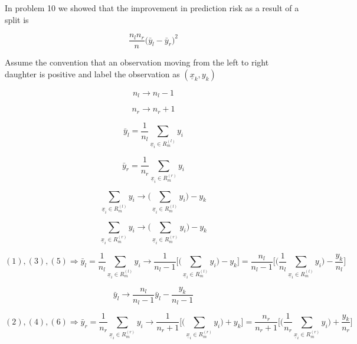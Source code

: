 \documentclass[11pt]{article}
\begin{document}
In problem 10 we showed that the improvement in prediction risk as a result of 
a split is 

$$ \frac{n_ln_r}{n}\big(\bar{y}_l - \bar{y}_r\big)^2$$

Assume the convention that an observation moving from the left to right 
daughter is positive and label the observation as $(\underline{x}_k, y_k)$

\begin{equation}
n_l \rightarrow n_l - 1
\end{equation}

\begin{equation}
n_r \rightarrow n_r + 1
\end{equation}

\begin{equation}
\bar{y}_l = \frac{1}{n_l}\sum_{\underline{x}_i \in R_m^{(l)}}y_i
\end{equation}

\begin{equation}
\bar{y}_r = \frac{1}{n_r}\sum_{\underline{x}_i \in R_m^{(r)}}y_i
\end{equation}

\begin{equation}
\sum_{ \underline{x}_i \in R_m^{(l)}} y_i \rightarrow \bigg( 
\sum_{ \underline{x}_i \in R_m^{(l)}}y_i \bigg) - y_k
\end{equation}

\begin{equation}
\sum_{ \underline{x}_i \in R_m^{(r)}} y_i \rightarrow \bigg( 
\sum_{ \underline{x}_i \in R_m^{(r)}}y_i \bigg) - y_k
\end{equation}

$$(1), (3), (5) \Rightarrow \bar{y}_l = \frac{1}{n_l}\sum_{\underline{x}_i 
\in R_m^{(l)}}y_i \rightarrow \frac{1}{n_l-1}\Bigg[\bigg(\sum_{\underline{x}_i 
\in R_m^{(l)}}y_i\bigg)-y_k\Bigg] = \frac{n_l}{n_l-1}
\Bigg[\bigg(\frac{1}{n_l}\sum_{\underline{x}_i \in R_m^{(l)}}y_i\bigg) - 
\frac{y_k}{n_l}\Bigg]$$

\begin{equation}
\bar{y}_l \rightarrow \frac{n_l}{n_l-1}\bar{y}_l - \frac{y_k}{n_l-1}
\end{equation}

$$(2), (4), (6) \Rightarrow \bar{y}_r = \frac{1}{n_r}\sum_{\underline{x}_i 
\in R_m^{(r)}}y_i \rightarrow \frac{1}{n_r+1}\Bigg[\bigg(\sum_{\underline{x}_i 
\in R_m^{(r)}}y_i\bigg)+y_k\Bigg] = \frac{n_r}{n_r+1}\Bigg[\bigg(\frac{1}{n_r}
\sum_{\underline{x}_i \in R_m^{(r)}}y_i\bigg) + \frac{y_k}{n_r}\Bigg]$$
\end{document}
